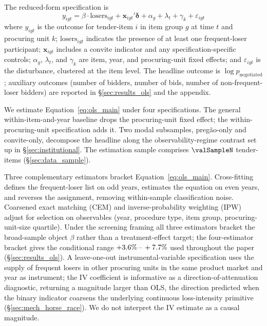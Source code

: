 The reduced-form specification is
\begin{equation}
  y_{igt} = \beta \cdot \text{losers}_{igt}
  + \mathbf{x}_{igt}' \boldsymbol{\delta}
  + \alpha_g + \lambda_t + \gamma_k + \varepsilon_{igt}
  \label{eq:ols_main}
\end{equation}
where $y_{igt}$ is the outcome for tender-item $i$ in item group
$g$ at time $t$ and procuring unit $k$; $\text{losers}_{igt}$
indicates the presence of at least one frequent-loser participant;
$\mathbf{x}_{igt}$ includes a convite indicator and any
specification-specific controls; $\alpha_g$, $\lambda_t$, and
$\gamma_k$ are item, year, and procuring-unit fixed effects; and
$\varepsilon_{igt}$ is the disturbance, clustered at the item
level. The headline outcome is $\log p_{\text{negotiated}}$;
auxiliary outcomes (number of bidders, number of bids, number of
non-frequent-loser bidders) are reported in
§\ref{sec:results_ols} and the appendix.

We estimate Equation~\eqref{eq:ols_main} under four
specifications. The general within-item-and-year baseline drops
the procuring-unit fixed effect; the within-procuring-unit
specification adds it. Two modal subsamples, preg\~ao-only and
convite-only, decompose the headline along the observability-regime
contrast set up in §\ref{sec:institutional}. The estimation
sample comprises $\valSampleN$ tender-items
(§\ref{sec:data_sample}).

Three complementary estimators bracket
Equation~\eqref{eq:ols_main}. Cross-fitting defines the
frequent-loser list on odd years, estimates the equation on
even years, and reverses the assignment, removing within-sample
classification noise. Coarsened exact matching (CEM) and
inverse-probability weighting (IPW) adjust for selection on
observables (year, procedure type, item group,
procuring-unit-size quartile). Under the screening framing all
three estimators bracket the broad-sample object $\beta$ rather
than a treatment-effect target; the four-estimator bracket
gives the conditional range $+3.6\%\,\text{--}\,+7.7\%$ used throughout
the paper (§\ref{sec:results_ols}). A leave-one-out
instrumental-variable specification uses the supply of frequent
losers in other procuring units in the same product market and
year as instrument; the IV coefficient is informative as a
direction-of-attenuation diagnostic, returning a magnitude
larger than OLS, the direction predicted when the binary
indicator coarsens the underlying continuous loss-intensity
primitive (§\ref{sec:mech_horse_race}). We do not interpret the
IV estimate as a causal magnitude.

